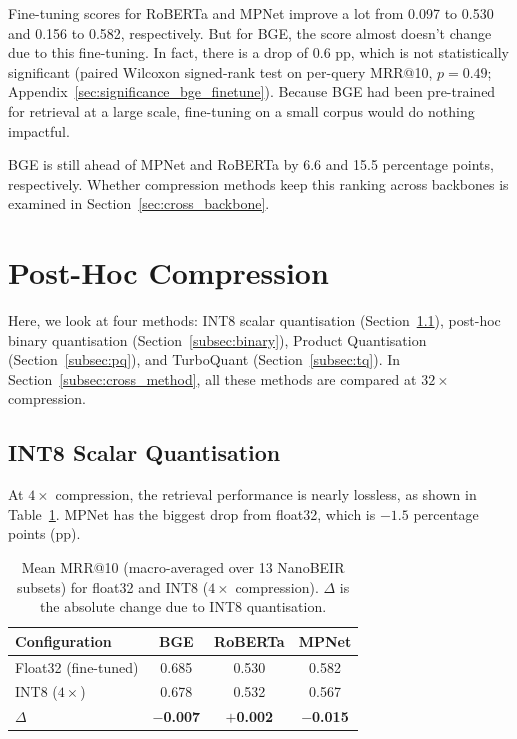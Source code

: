 Fine-tuning scores for RoBERTa and MPNet improve a lot from 0.097 to
0.530 and 0.156 to 0.582, respectively. But for BGE, the score almost
doesn't change due to this fine-tuning. In fact, there is a drop of
0.6 pp, which is not statistically significant (paired Wilcoxon
signed-rank test on per-query MRR@10, $p = 0.49$;
Appendix~\ref{sec:significance_bge_finetune}). Because BGE had been
pre-trained for retrieval at a large scale, fine-tuning on a small
corpus would do nothing impactful.

BGE is still ahead of MPNet and RoBERTa by 6.6 and 15.5 percentage
points, respectively. Whether compression methods keep this ranking
across backbones is examined in Section~\ref{sec:cross_backbone}.

\section{Post-Hoc Compression}
\label{sec:posthoc_compression}

Here, we look at four methods: INT8 scalar quantisation
(Section~\ref{subsec:int8}), post-hoc binary quantisation
(Section~\ref{subsec:binary}), Product Quantisation
(Section~\ref{subsec:pq}), and TurboQuant (Section~\ref{subsec:tq}).
In Section~\ref{subsec:cross_method}, all these methods are compared
at $32\times$ compression.

\subsection{INT8 Scalar Quantisation}
\label{subsec:int8}

At $4\times$ compression, the retrieval performance is nearly lossless,
as shown in Table~\ref{tab:int8}. MPNet has the biggest drop from
float32, which is $-1.5$ percentage points (pp).

\begin{table}[H]
  \centering
  \caption[Float32 vs INT8 ($4\times$ compression).]{Mean MRR@10 (macro-averaged over 13 NanoBEIR subsets) for float32 and INT8 ($4\times$ compression). $\Delta$ is the absolute change due to INT8 quantisation.}
  \label{tab:int8}
  \begin{tabular}{| l | c | c | c |}
    \hline
    \textbf{Configuration} & \textbf{BGE} & \textbf{RoBERTa} & \textbf{MPNet} \\ [0.5ex] \hline
    Float32 (fine-tuned)   & 0.685 & 0.530 & 0.582 \\ \hline
    INT8 ($4\times$)       & 0.678 & 0.532 & 0.567 \\ \hline
    \textbf{$\Delta$}      & $\mathbf{-}$\textbf{0.007} & $\mathbf{+}$\textbf{0.002} & $\mathbf{-}$\textbf{0.015} \\ \hline
  \end{tabular}
\end{table}

